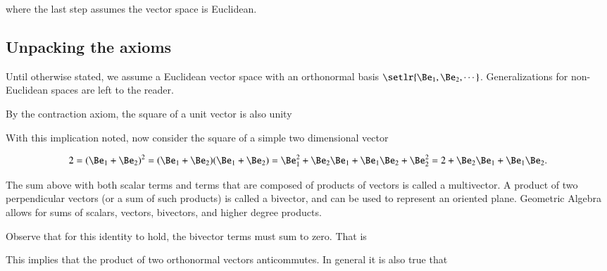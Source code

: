where the last step assumes the vector space is Euclidean.

\subsection{Unpacking the axioms}

Until otherwise stated, we assume a Euclidean vector space with an orthonormal basis \( \setlr{\Be_1, \Be_2, \cdots } \).  Generalizations for non-Euclidean spaces are left to the reader.

By the contraction axiom, the square of a unit vector is also unity


With this implication noted, now consider the square of a simple two dimensional vector

\begin{dmath}\label{eqn:gaTutorial:80}
2
=
(\Be_1 + \Be_2)^2
= (\Be_1 + \Be_2)(\Be_1 + \Be_2)
= \Be_1^2 + \Be_2 \Be_1 + \Be_1 \Be_2 + \Be_2^2
= 2 + \Be_2 \Be_1 + \Be_1 \Be_2.
\end{dmath}

The sum above with both scalar terms and terms that are composed of products of vectors is called a multivector.
A product of two perpendicular vectors (or a sum of such products) is called a bivector, and can be used to represent an oriented plane.
Geometric Algebra allows for sums of scalars, vectors, bivectors, and higher degree products.

Observe that for this identity to hold, the bivector terms must sum to zero.
That is


This implies that the product of two orthonormal vectors anticommutes.
In general it is also true that


%


